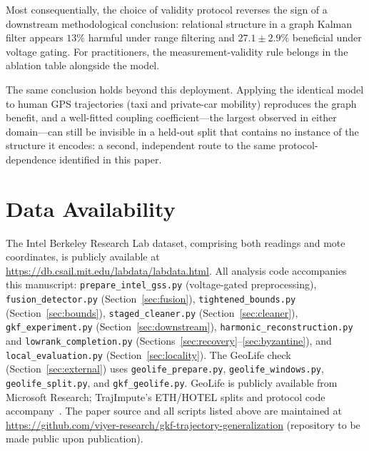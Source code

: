 \documentclass[conference]{IEEEtran}
\begin{document}
Most consequentially, the choice of validity protocol reverses the sign of a
downstream methodological conclusion: relational structure in a graph Kalman
filter appears $13\%$ harmful under range filtering and $27.1 \pm 2.9\%$
beneficial under voltage gating. For practitioners, the measurement-validity
rule belongs in the ablation table alongside the model.

The same conclusion holds beyond this deployment. Applying the identical
model to human GPS trajectories (taxi and private-car mobility) reproduces
the graph benefit, and a well-fitted coupling coefficient---the largest
observed in either domain---can still be invisible in a held-out split that
contains no instance of the structure it encodes: a second, independent
route to the same protocol-dependence identified in this paper.

\section*{Data Availability}

The Intel Berkeley Research Lab dataset, comprising both readings and mote
coordinates, is publicly available at
\url{https://db.csail.mit.edu/labdata/labdata.html}. All analysis code
accompanies this manuscript: \texttt{prepare\_intel\_gss.py} (voltage-gated
preprocessing), \texttt{fusion\_detector.py} (Section~\ref{sec:fusion}),
\texttt{tightened\_bounds.py} (Section~\ref{sec:bounds}),
\texttt{staged\_cleaner.py} (Section~\ref{sec:cleaner}),
\texttt{gkf\_experiment.py} (Section~\ref{sec:downstream}),
\texttt{harmonic\_reconstruction.py} and \texttt{lowrank\_completion.py}
(Sections~\ref{sec:recovery}--\ref{sec:byzantine}), and
\texttt{local\_evaluation.py} (Section~\ref{sec:locality}). The GeoLife
check (Section~\ref{sec:external}) uses
\texttt{geolife\_prepare.py}, \texttt{geolife\_windows.py},
\texttt{geolife\_split.py}, and \texttt{gkf\_geolife.py}. GeoLife is
publicly available from Microsoft Research; TrajImpute's ETH/HOTEL splits
and protocol code accompany~\cite{chib2024trajimpute}. The paper source and
all scripts listed above are maintained at
\url{https://github.com/viyer-research/gkf-trajectory-generalization}
(repository to be made public upon publication).
\end{document}

